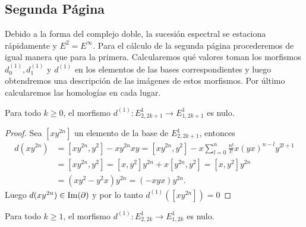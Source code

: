 \documentclass[fleqn,../tesis.tex]{subfiles}
\begin{document}
\subsection{Segunda Página}
Debido a la forma del complejo doble, la sucesión espectral se estaciona rápidamente y $E^2 = E^{\infty}$. Para el cálculo de la segunda página procederemos de igual manera que para la primera. Calcularemos
qué valores toman los morfismos $d_0^{(1)}, d_1^{(1)}$ y $d^{(1)}$ en los elementos de las bases correspondientes y luego obtendremos una descripción
de las imágenes de estos morfismos. Por último calcularemos las homologías en cada lugar.
\begin{prop} \label{prop_imad1impar}
    Para todo $k \geq 0$, el morfismo $d^{(1)}: E_{2, 2k + 1}^1 \to E_{1, 2k + 1}^1$ es nulo.
\end{prop}
\begin{proof}
	Sea $\left[xy^{2n}\right]$ un elemento de la base de $E_{2, 2k + 1}^1$, entonces
	\begin{align*}
		d(xy^{2n}) &= \left[ xy^{2n}, y^2 \right] - xy^{2n}xy
			= \left[ xy^{2n}, y^2 \right] - x\sum_{l = 0}^n\frac{n!}{l!}x(yx)^{n - l}y^{2l + 1}  \\
		&= \left[ xy^{2n}, y^2 \right] = \left[x, y^2 \right]y^{2n} + x\left[y^{2n}, y^2\right] =  \left[x, y^2 \right]y^{2n} \\
		&= (xy^2 - y^2x)y^{2n} = (-xyx)y^{2n}. 
	\end{align*}
	Luego $d(xy^{2n}) \in \operatorname{Im}(\partial)$ y por lo tanto $d^{(1)}(\left[xy^{2n}\right]) = 0$
	\end{proof}
\begin{prop}  \label{prop_imad1par}
Para todo $k \geq 1$, el morfismo $d^{(1)}: E_{2, 2k}^1 \to E_{1, 2k}^1$ es nulo.
\end{prop}
\end{document}
